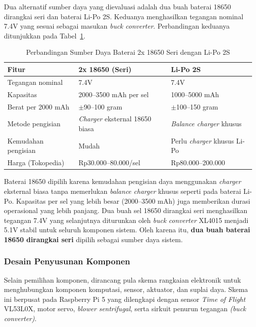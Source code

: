 Dua alternatif sumber daya yang dievaluasi adalah dua buah baterai 18650 dirangkai seri dan baterai Li-Po 2S. Keduanya menghasilkan tegangan nominal 7.4V yang sesuai sebagai masukan \emph{buck converter}. Perbandingan keduanya ditunjukkan pada Tabel~\ref{tab:perbandingan-baterai}.

\begin{table}[H]
\centering
\caption{Perbandingan Sumber Daya Baterai 2x 18650 Seri dengan Li-Po 2S}
\label{tab:perbandingan-baterai}
\begin{tabular}{|p{3.5cm}|p{5.5cm}|p{5.5cm}|}
\hline
\textbf{Fitur} & \textbf{2x 18650 (Seri)} & \textbf{Li-Po 2S} \\
\hline
Tegangan nominal & 7.4V & 7.4V \\
\hline
Kapasitas & 2000--3500 mAh per sel & 1000--5000 mAh \\
\hline
Berat per 2000 mAh & $\pm$90--100 gram & $\pm$100--150 gram \\
\hline
Metode pengisian & \emph{Charger} eksternal 18650 biasa & \emph{Balance charger} khusus \\
\hline
Kemudahan pengisian & Mudah & Perlu \emph{charger} khusus Li-Po \\
\hline
Harga (Tokopedia) & Rp30.000--80.000/sel & Rp80.000--200.000 \\
\hline
\end{tabular}
\end{table}

Baterai 18650 dipilih karena kemudahan pengisian daya menggunakan \emph{charger} eksternal biasa tanpa memerlukan \emph{balance charger} khusus seperti pada baterai Li-Po. Kapasitas per sel yang lebih besar (2000--3500 mAh) juga memberikan durasi operasional yang lebih panjang. Dua buah sel 18650 dirangkai seri menghasilkan tegangan 7.4V yang selanjutnya diturunkan oleh \emph{buck converter} XL4015 menjadi 5.1V stabil untuk seluruh komponen sistem. Oleh karena itu, \textbf{dua buah baterai 18650 dirangkai seri} dipilih sebagai sumber daya sistem.

\subsubsection{Desain Penyusunan Komponen}
\label{subsubsec:desain-penyusunan-komponen}

Selain pemilihan komponen, dirancang pula skema rangkaian elektronik untuk menghubungkan komponen komputasi, sensor, aktuator, dan suplai daya. Skema ini berpusat pada Raspberry Pi 5 yang dilengkapi dengan sensor \emph{Time of Flight} VL53L0X, motor servo, \emph{blower sentrifugal}, serta sirkuit penurun tegangan \emph{(buck converter)}.


